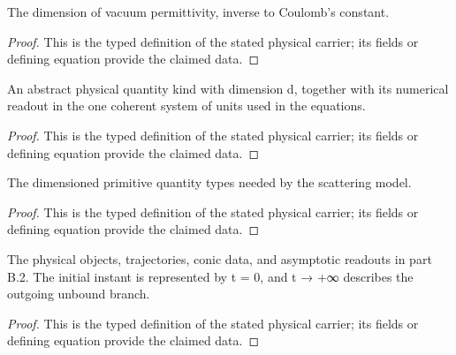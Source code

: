 \begin{definition}
  \label{def:physics:IPhO_2026_1_B_2:aux007}
  The dimension of vacuum permittivity, inverse to Coulomb's constant.
\end{definition}
\begin{proof}
  This is the typed definition of the stated physical carrier; its fields or defining equation provide the claimed data.
\end{proof}

\begin{definition}
  \label{def:physics:IPhO_2026_1_B_2:aux008}
  An abstract physical quantity kind with dimension d, together with its numerical readout in the one coherent system of units used in the equations.
\end{definition}
\begin{proof}
  This is the typed definition of the stated physical carrier; its fields or defining equation provide the claimed data.
\end{proof}

\begin{definition}
  \label{def:physics:IPhO_2026_1_B_2:aux009}
  The dimensioned primitive quantity types needed by the scattering model.
\end{definition}
\begin{proof}
  This is the typed definition of the stated physical carrier; its fields or defining equation provide the claimed data.
\end{proof}

\begin{definition}
  \label{def:physics:IPhO_2026_1_B_2:aux010}
  The physical objects, trajectories, conic data, and asymptotic readouts in part B.2. The initial instant is represented by t = 0, and t → +∞ describes the outgoing unbound branch.
\end{definition}
\begin{proof}
  This is the typed definition of the stated physical carrier; its fields or defining equation provide the claimed data.
\end{proof}

